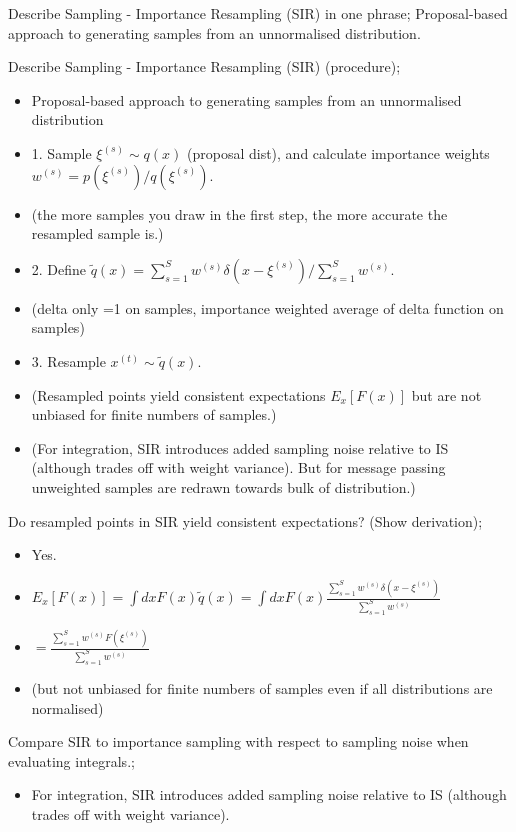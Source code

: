 \documentclass{article}
\begin{document}


Describe Sampling - Importance Resampling (SIR) in one phrase; Proposal-based approach to generating samples from an unnormalised distribution.

Describe Sampling - Importance Resampling (SIR) (procedure); \begin{itemize} \item Proposal-based approach to generating samples from an unnormalised distribution \item 1. Sample $\xi^{(s)} \sim q(x)$ (proposal dist), and calculate importance weights $w^{(s)} = p(\xi^{(s)})/q(\xi^{(s)})$. \item (the more samples you draw in the first step, the more accurate the resampled sample is.) \item 2. Define $\tilde{q}(x) = \sum_{s=1}^S w^{(s)}\delta(x-\xi^{(s)})/\sum_{s=1}^S w^{(s)}$. \item (delta only =1 on samples, importance weighted average of delta function on samples) \item 3. Resample $x^{(t)}\sim \tilde{q}(x)$. \item (Resampled points yield consistent expectations $E_x[F(x)]$ but are not unbiased for finite numbers of samples.) \item (For integration, SIR introduces added sampling noise relative to IS (although trades off with weight variance). But for message passing unweighted samples are redrawn towards bulk of distribution.) \end{itemize}

Do resampled points in SIR yield consistent expectations? (Show derivation); \begin{itemize} \item Yes. \item $E_x[F(x)] = \int dx F(x)\tilde{q}(x) = \int dx F(x) \frac{\sum_{s=1}^S w^{(s)}\delta(x-\xi^{(s)})}{\sum_{s=1}^Sw^{(s)}}$ \item $=\frac{\sum_{s=1}^S w^{(s)}F(\xi^{(s)})}{\sum_{s=1}^Sw^{(s)}}$ \item (but not unbiased for finite numbers of samples even if all distributions are normalised) \end{itemize}

Compare SIR to importance sampling with respect to sampling noise when evaluating integrals.; \begin{itemize} \item For integration, SIR introduces added sampling noise relative to IS (although trades off with weight variance).  \end{itemize}
\end{document}

